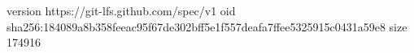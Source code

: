 version https://git-lfs.github.com/spec/v1
oid sha256:184089a8b358feeac95f67de302bff5e1f557deafa7ffee5325915c0431a59e8
size 174916
